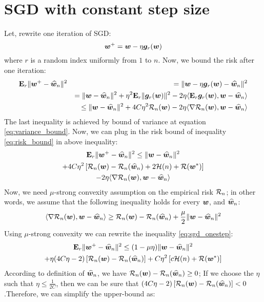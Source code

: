 \documentclass{article}
\begin{document}
\section{SGD with constant step size}
Let, rewrite one iteration of SGD:
\begin{equation*}
	\bm{w}^+ = \bm{w} - \eta \bm{g}_r(\bm{w})
\end{equation*}
where $r$ is a random index uniformly from $1$ to $n$. Now, we bound the risk
after one iteration: 
\begin{eqnarray*}
	&  \mathbf{E}_r \| \bm{w}^+ - \widehat{\bm{w}}_n\|^2 & = \|\bm{w} - \eta \bm{g}_r(\bm{w}) - \widehat{\bm{w}}_n \|^2 \\
	& & = \| \bm{w} - \widehat{\bm{w}}_n \|^2 + \eta^2 \mathbf{E}_r \| \bm{g}_r(\bm{w}) \|^2 - 2 \eta \langle
	\mathbf{E}_r \bm{g}_r(\bm{w}), \bm{w} - \widehat{\bm{w}}_n \rangle \\ 
	& & \leq \| \bm{w} - \widehat{\bm{w}}_n \|^2 + 4 C \eta^2 {\cal R}_n(\bm{w})  - 2 \eta \langle
	\nabla {\cal R}_n(\bm{w}), \bm{w} - \widehat{\bm{w}}_n \rangle
\end{eqnarray*}
The last inequality is achieved by bound of variance at equation
\ref{eq:variance_bound}. Now, we can plug in the risk bound of inequality
\ref{eq:risk_bound} in above inequality: 
\begin{multline} \label{eq:sgd_onestep}
	\mathbf{E}_r \| \bm{w}^+ - \widehat{\bm{w}}_n\|^2 \leq \| \bm{w} - \widehat{\bm{w}}_n \|^2 \\
	+ 4 C \eta^2 \left[{\cal R}_n(\bm{w}) - {\cal R}_n(\widehat{\bm{w}}_n) + 2 {\cal H}(n) + {\cal R}(\bm{w}^*)\right]
	\\  - 2
	\eta \langle \nabla {\cal R}_n(\bm{w}), \bm{w} - \widehat{\bm{w}}_n \rangle
\end{multline}
Now, we need $\mu$-strong convexity assumption on the empirical risk
${\cal R}_n$; in other words, we assume that the following inequality holds for every $\bm{w}$,
and $\widehat{\bm{w}}_n$:
\begin{equation*}
	\langle \nabla {\cal R}_n(\bm{w}), \bm{w} - \widehat{\bm{w}}_n \rangle \geq {\cal R}_n(\bm{w}) - {\cal R}_n(\widehat{\bm{w}}_n)
	+ \frac{\mu}{2} \| \bm{w} - \widehat{\bm{w}}_n \|^2 
\end{equation*}
Using $\mu$-strong convexity we can rewrite the inequality \ref{eq:sgd_onestep}: 
\begin{multline*}
	\mathbf{E}_r \| \bm{w}^+ - \widehat{\bm{w}}_n\|^2 \leq (1-\mu \eta) \| \bm{w} - \widehat{\bm{w}}_n \|^2 \\
	+ \eta (4C\eta -2) \left[ {\cal R}_n(\bm{w}) - {\cal R}_n(\widehat{\bm{w}}_n) \right]
	+ C \eta^2 \left[c {\cal H}(n) + {\cal R}(\bm{w}^*)\right]
\end{multline*}
According to definition of $\widehat{\bm{w}}_n$, we have ${\cal R}_n(\bm{w}) - {\cal R}_n(\widehat{\bm{w}}_n) \geq
0$; If we choose the $\eta$ such that $\eta \leq \frac{1}{2 C}$, then we can be
sure that $(4C\eta -2) \left[ {\cal R}_n(\bm{w}) - {\cal R}_n(\widehat{\bm{w}}_n) \right] <0
$.Therefore, we can simplify the upper-bound as: 
\end{document}
